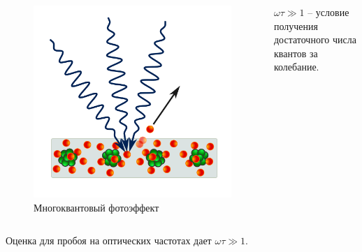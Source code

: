 \documentclass{beamer}
\begin{document}
\begin{frame}
\begin{columns}
			\begin{figure}
				\centering
				\includegraphics[width=0.7\linewidth]{res/multiphoton.png}
				\caption*{Многоквантовый фотоэффект}
			\end{figure}
			\footnotesize
			$\omega \tau \gg 1$ -- условие получения достаточного числа квантов за колебание.
		\end{columns}
		\vspace{10pt}
		Оценка для пробоя на оптических частотах дает $\omega \tau \gg 1$.
		
	\end{frame}
	
\end{document}
